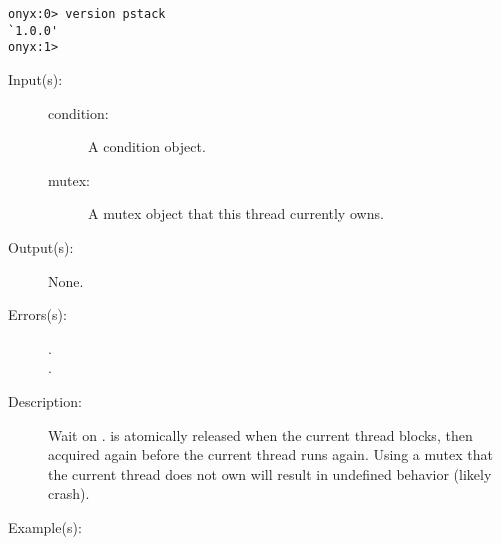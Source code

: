 \begin{description}
\begin{description}
\begin{verbatim}
onyx:0> version pstack
`1.0.0'
onyx:1>
		\end{verbatim}
	\end{description}
\label{systemdict:wait}
\item[{\onyxop{condition mutex}{wait}{--}}: ]
	\begin{description}\item[]
	\item[Input(s): ]
		\begin{description}\item[]
		\item[condition: ]
			A condition object.
		\item[mutex: ]
			A mutex object that this thread currently owns.
		\end{description}
	\item[Output(s): ] None.
	\item[Errors(s): ]
		\begin{description}\item[]
		\item[.]
		\item[.]
		\end{description}
	\item[Description: ]
		Wait on .   is atomically released
		when the current thread blocks, then acquired again before the
		current thread runs again.  Using a mutex that the current
		thread does not own will result in undefined behavior (likely
		crash).
	\item[Example(s): ]\begin{verbatim}


\end{verbatim}
\end{description}
\end{description}
